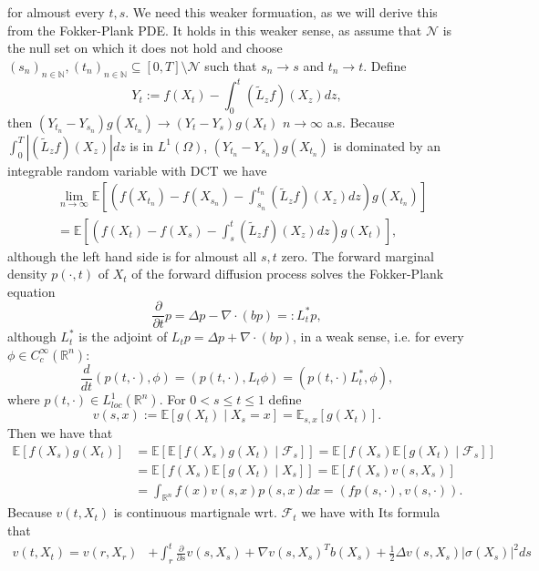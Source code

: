 \documentclass[a4paper,12pt,twoside]{article}
\begin{document}
{\[    \]
    for almoust every $t,s$. We need this weaker formuation, as we will derive this from the Fokker-Plank PDE. It holds in this weaker sense, as assume that $\mathcal{N}$ is the null set on which it does not hold and choose $(s_n)_{n \in \mathbb{N}}, (t_n)_{n \in \mathbb{N}} \subseteq [0,T] \setminus \mathcal{N}$ such that $s_n \to s$ and $t_n \to t$. Define 
    \[
    Y_t := f(X_t) - \int_0^t (\tilde{L}_z f) (X_z) dz,
    \]
    then $(Y_{t_n}-Y_{s_n}) g(X_{t_n}) \to (Y_t-Y_s) g(X_t)$ $n \to \infty$ a.s. Because $\int_0^T |(\tilde{L}_z f )(X_z)| dz$ is in $L^1(\Omega)$, $(Y_{t_n} -Y_{s_n}) g(X_{t_n})$ is dominated by an integrable random variable with DCT we have 
    \begin{align*}
        & \lim_{n \to \infty} \mathbb{E}[ (f(X_{t_n}) - f(X_{s_n})- \int_{s_n}^{t_n} (\tilde{L}_z f)(X_z) dz ) g(X_{t_n}) ] \\
        &= \mathbb{E}[ ( f(X_t)-f(X_s)- \int_s^t (\tilde{L}_z f)(X_z) dz ) g(X_t) ],
    \end{align*}
    although the left hand side is for almoust all $s,t$ zero. The forward marginal density $p(\cdot,t)$ of $X_t$ of the forward diffusion process solves the Fokker-Plank equation 
    \[
    \frac{\partial}{\partial t} p = \Delta p - \nabla \cdot (b p) =: L_t^* p,
    \]
    although $L_t^*$ is the adjoint of $L_t p = \Delta p + \nabla \cdot (bp)$, in a weak sense, i.e. for every $\phi \in C_c^\infty (\mathbb{R}^n)$: 
    \[
    \frac{d}{dt} ( p(t,\cdot),\phi ) =( p(t,\cdot),L_t \phi) = (p(t,\cdot) L_t^*, \phi),
    \]
    where $p(t,\cdot) \in L_{loc}^1(\mathbb{R}^n)$. For $0 < s\leq t \leq 1$ define 
    \[
    v(s,x):= \mathbb{E}[ g(X_t) \mid X_s =x] = \mathbb{E}_{s,x}[ g(X_t) ].
    \]
    Then we have that 
    \begin{align*}
        \mathbb{E}[ f(X_s) g(X_t) ]&= \mathbb{E}[\mathbb{E}[ f(X_s) g(X_t) \mid \mathcal{F}_s ] ]= \mathbb{E}[ f(X_s) \mathbb{E}[ g(X_t) \mid \mathcal{F}_s ] ] \\
        &= \mathbb{E}[ f(X_s) \mathbb{E}[ g(X_t) \mid X_s ] ] = \mathbb{E}[ f(X_s) v(s,X_s) ] \\
        &= \int_{\mathbb{R}^n} f(x) v(s,x) p(s,x) dx = (f p(s,\cdot),v(s,\cdot) ).
    \end{align*}
    Because $v(t,X_t)$ is continuous martignale wrt. $\mathcal{F}_t$ we have with Its formula that 
    \begin{align*}
        v(t,X_t) = v(r,X_r) &+ \int_r^t \frac{\partial}{\partial s} v(s,X_s) + \nabla v(s,X_s)^T b(X_s) + \frac{1}{2} \Delta v(s,X_s) |\sigma(X_s)|^2 ds \\

\end{align*}}
\end{document}
